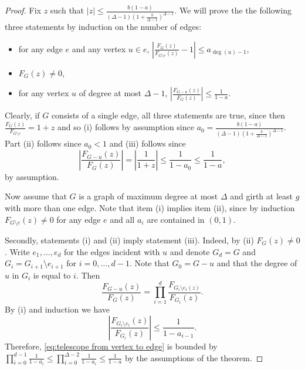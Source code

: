 \documentclass[a4paper,11pt,reqno]{amsart}
\numberwithin{equation}{section}
\begin{document}
\begin{proof}
Fix $z$ such that $|z|\leq \frac{b(1-a)}{(\Delta-1)(1+\tfrac{b}{\Delta-1})^{\Delta-1}}$.
We will prove the the following three statements by induction on the number of edges:
\begin{itemize}
    \item[(i)] for any edge $e$ and any vertex $u\in e$, $\left|\frac{F_G(z)}{F_{G\setminus e}(z)}-1\right|\leq a_{\deg(u)-1}$,
    \item[(ii)] $F_G(z)\neq 0$,
    \item[(iii)] for any vertex $u$ of degree at most $\Delta-1$, $\left|\frac{F_{G-u}(z)}{F_{G}(z)}\right|\leq \frac{1}{1-a}$.
\end{itemize}
Clearly, if $G$ consists of a single edge, all three statements are true, since then $\tfrac{F_G(z)}{F_{G\setminus e}}=1+z$ and so (i) follows by assumption since $a_0=\frac{b(1-a)}{(\Delta-1)(1+\tfrac{b}{\Delta-1})^{\Delta-1}}$.
Part (ii) follows since $a_0<1$ and (iii) follows since 
\[
\left |\frac{F_{G-u}(z)}{F_G(z)}\right |=\left |\frac{1}{1+z}\right |\leq \frac{1}{1-a_0}\leq \frac{1}{1-a},
\]
by assumption.

Now assume that $G$ is a graph of maximum degree at most $\Delta$ and girth at least $g$ with more than one edge.
Note that item (i) implies item (ii), since by induction $F_{G\setminus e}(z)\neq 0$ for any edge $e$ and all $a_i$ are contained in $(0,1)$.

Secondly, statements (i) and (ii) imply statement (iii).
Indeed, by (ii) $F_G(z)\neq 0$. Write $e_1,\ldots,e_d$ for the edges incident with $u$ and denote $G_d=G$ and $G_i=G_{i+1}\setminus e_{i+1}$ for $i=0,\ldots,d-1$.
Note that $G_0=G-u$ and that the degree of $u$ in $G_{i}$ is equal to $i.$
Then 
\begin{equation}\label{eq:telescope from vertex to edge}
 \frac{F_{G-u}(z)}{F_{G}(z)}=\prod_{i=1}^{d} \frac{F_{G_{i}\setminus e_i(z)}}{{F_{G_{i}}}(z)}. \end{equation}
By (i) and induction we have 
\[
\left|\frac{F_{G_i\setminus e_i}(z)}{F_{G_i}(z)}\right|\leq \frac{1}{1-a_{i-1}}.
\]
Therefore, \eqref{eq:telescope from vertex to edge} is bounded by $\prod_{i=0}^{d-1}\tfrac{1}{1-a_i}\leq \prod_{i=0}^{\Delta-2}\tfrac{1}{1-a_i}\leq \tfrac{1}{1-a}$ by the assumptions of the theorem.


\end{proof}
\end{document}
